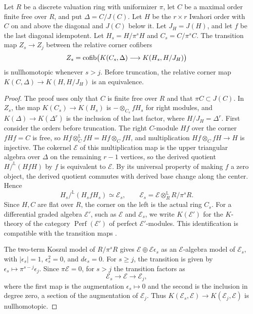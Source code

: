 \begin{lemma}\label{lem:app-iwahori-derived-cut}
Let $R$ be a discrete valuation ring with uniformizer $\pi$, let $C$ be a maximal order finite free over $R$, and put $\Delta=C/J(C)$.
Let $H$ be the $r\times r$ Iwahori order with $C$ on and above the diagonal and $J(C)$ below it.
Let $J_H=J(H)$, and let $f$ be the last diagonal idempotent.
Let $H_s=H/\pi^sH$ and $C_s=C/\pi^sC$.
The transition map $Z_s\to Z_j$ between the relative corner cofibers
\[
 Z_s=\operatorname{cofib}\bigl(K(C_s,\Delta)
       \longrightarrow K(H_s,H/J_H)\bigr)
\]
is nullhomotopic whenever $s>j$.
Before truncation, the relative corner map $K(C,\Delta)\to K(H,H/J_H)$ is an equivalence.
\end{lemma}
\begin{proof}
The proof uses only that $C$ is finite free over $R$ and that $\pi C\subset J(C)$.
In $Z_s$, the map $K(C_s)\to K(H_s)$ is $-\otimes_{C_s}fH_s$ for right modules, and $K(\Delta)\to K(\Delta^r)$ is the inclusion of the last factor, where $H/J_H=\Delta^r$.
First consider the orders before truncation.
The right $C$-module $Hf$ over the corner $fHf=C$ is free, so $Hf\otimes^{\mathbb L}_CfH=Hf\otimes_CfH$, and multiplication $Hf\otimes_C fH\to H$ is injective.
The cokernel $\mathcal E$ of this multiplication map is the upper triangular algebra over $\Delta$ on the remaining $r-1$ vertices, so the derived quotient $H/^{\mathbb L}(HfH)$ by $f$ is equivalent to $\mathcal E$.
By its universal property of making $f$ a zero object, the derived quotient commutes with derived base change along the center.
Hence
\[
 H_s/^{\mathbb L}(H_sfH_s)
 \simeq\mathcal E_s,\qquad\mathcal E_s=\mathcal E\otimes_R^{\mathbb L}R/\pi^sR.
\]
Since $H,C$ are flat over $R$, the corner on the left is the actual ring $C_s$.
For a differential graded algebra $\mathcal E'$, such as $\mathcal E$ and $\mathcal E_s$, we write $K(\mathcal E')$ for the $K$-theory of the category $\operatorname{Perf}(\mathcal E')$ of perfect $\mathcal E'$-modules.
This identification is compatible with the transition maps \cite{BraunChuangLazarev}.

The two-term Koszul model of $R/\pi^sR$ gives $\mathcal E\oplus\mathcal E\epsilon_s$ as an $\mathcal E$-algebra model of $\mathcal E_s$, with $|\epsilon_s|=1$, $\epsilon_s^2=0$, and $d\epsilon_s=0$.
For $s\ge j$, the transition is given by $\epsilon_s\mapsto\pi^{s-j}\epsilon_j$.
Since $\pi\mathcal E=0$, for $s>j$ the transition factors as
\[
 \mathcal E_s\longrightarrow\mathcal E\longrightarrow\mathcal E_j,
\]
where the first map is the augmentation $\epsilon_s\mapsto0$ and the second is the inclusion in degree zero, a section of the augmentation of $\mathcal E_j$.
Thus $K(\mathcal E_s,\mathcal E)\to K(\mathcal E_j,\mathcal E)$ is nullhomotopic.


\end{proof}
